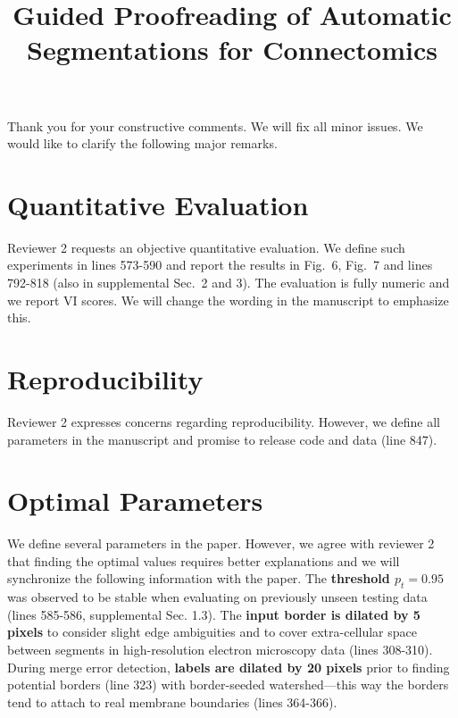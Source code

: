\documentclass[10pt,twocolumn,letterpaper]{article}
\begin{document}
\title{Guided Proofreading of Automatic Segmentations for Connectomics}  %

\maketitle
\thispagestyle{empty}

Thank you for your constructive comments. We will fix all minor issues. We would like to clarify the following major remarks.

\section{Quantitative Evaluation}
Reviewer 2 requests an objective quantitative evaluation. We define such experiments in lines 573-590 and report the results in Fig.~6, Fig.~7 and lines 792-818 (also in supplemental Sec.~2 and 3). The evaluation is fully numeric and we report VI scores. We will change the wording in the manuscript to emphasize this.

\section{Reproducibility}
Reviewer 2 expresses concerns regarding reproducibility. However, we define all parameters in the manuscript and promise to release code and data (line 847).

\section{Optimal Parameters}
We define several parameters in the paper. However, we agree with reviewer 2 that finding the optimal values requires better explanations and we will synchronize the following information with the paper. 
The \textbf{threshold $p_t=0.95$} was observed to be stable when evaluating on previously unseen testing data (lines 585-586, supplemental Sec. 1.3). The \textbf{input border is dilated by 5 pixels} to consider slight edge ambiguities and to cover extra-cellular space between segments in high-resolution electron microscopy data (lines 308-310). During merge error detection, \textbf{labels are dilated by 20 pixels} prior to finding potential borders (line 323) with border-seeded watershed---this way the borders tend to attach to real membrane boundaries (lines 364-366).  
\end{document}
